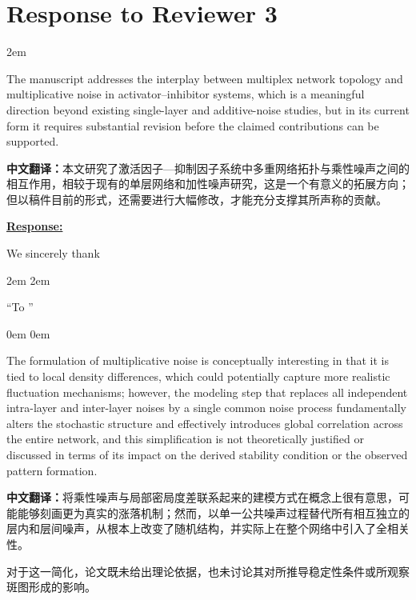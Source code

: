 \documentclass[a4paper,12pt]{article}
\newcommand{\zhtranslationfirst}[1]{%
    \par\medskip\noindent
    {\small\color{blue!60!black}\textbf{中文翻译：}#1}\par
}
\newcommand{\zhtranslation}[1]{%
    \par\smallskip\noindent
    {\small\color{blue!60!black}#1}\par
}
\begin{document}


\newpage
\section*{Response to Reviewer 3}
\parindent 2em

\begin{tcolorbox}[title = {General Comment},fonttitle = \bfseries]
    The manuscript addresses the interplay between multiplex network topology and multiplicative noise in activator–inhibitor systems, which is a meaningful direction beyond existing single-layer and additive-noise studies, but in its current form it requires substantial revision before the claimed contributions can be supported.
    \zhtranslationfirst{本文研究了激活因子—抑制因子系统中多重网络拓扑与乘性噪声之间的相互作用，相较于现有的单层网络和加性噪声研究，这是一个有意义的拓展方向；但以稿件目前的形式，还需要进行大幅修改，才能充分支撑其所声称的贡献。}
\end{tcolorbox}

\noindent \underline {\textbf{Response:}}
\bigskip

We sincerely thank

\leftskip 2em
\rightskip 2em
\medskip

``To ''

\leftskip 0em
\rightskip 0em
\medskip

\newpage
\begin{tcolorbox}[title = {Comment 1},fonttitle = \bfseries]
    The formulation of multiplicative noise is conceptually interesting in that it is tied to local density differences, which could potentially capture more realistic fluctuation mechanisms; however, the modeling step that replaces all independent intra-layer and inter-layer noises by a single common noise process fundamentally alters the stochastic structure and effectively introduces global correlation across the entire network, and this simplification is not theoretically justified or discussed in terms of its impact on the derived stability condition or the observed pattern formation.
    \zhtranslationfirst{将乘性噪声与局部密局度差联系起来的建模方式在概念上很有意思，可能能够刻画更为真实的涨落机制；然而，以单一公共噪声过程替代所有相互独立的层内和层间噪声，从根本上改变了随机结构，并实际上在整个网络中引入了全相关性。}
    \zhtranslation{对于这一简化，论文既未给出理论依据，也未讨论其对所推导稳定性条件或所观察斑图形成的影响。}
\end{tcolorbox}
\end{document}

